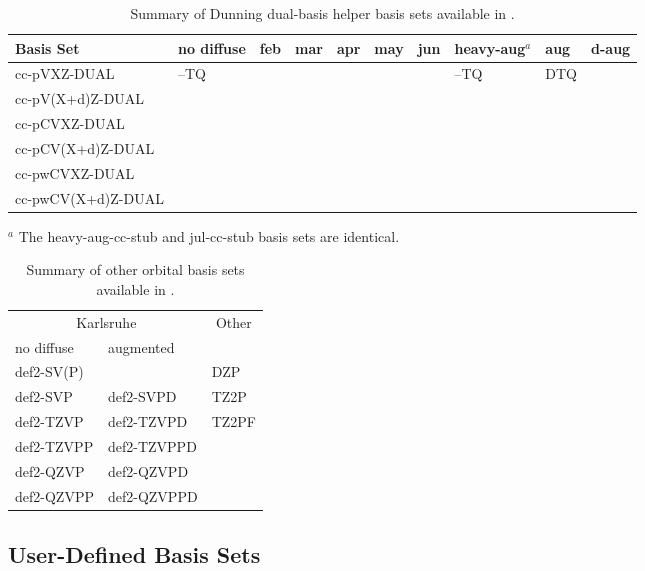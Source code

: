 \begin{table}[!htbp]
\begin{footnotesize}
\caption{Summary of Dunning dual-basis helper basis sets available in \PSIfour.} \label{table:basisDunningDUAL}
\parsep 10pt
\begin{center}
\begin{tabular}{llllllllll}
\hline\hline
Basis Set            & no diffuse & feb & mar & apr & may & jun & heavy-aug$^a$ & aug & d-aug \\
\hline
cc-pVXZ-DUAL         & --TQ &  &  &  &  &  & --TQ & DTQ &  \\
cc-pV(X+d)Z-DUAL     \\
cc-pCVXZ-DUAL        \\
cc-pCV(X+d)Z-DUAL    \\
cc-pwCVXZ-DUAL       \\
cc-pwCV(X+d)Z-DUAL   \\
\hline\hline
\end{tabular}
\end{center}
$^a$ The heavy-aug-cc-stub and jul-cc-stub basis sets are identical.
\end{footnotesize}
\end{table}


\begin{table}[!htbp]
\begin{footnotesize}
\caption{Summary of other orbital basis sets available in \PSIfour.} \label{table:basisOther}
\parsep 10pt
\begin{center}
\begin{tabular}{lll}
\hline\hline
\multicolumn{2}{c}{Karlsruhe} & \multicolumn{1}{c}{Other} \\
no diffuse & augmented & \\
\hline
def2-SV(P)   &             & DZP   \\
def2-SVP     & def2-SVPD   & TZ2P  \\
def2-TZVP    & def2-TZVPD  & TZ2PF \\
def2-TZVPP   & def2-TZVPPD &       \\
def2-QZVP    & def2-QZVPD  &       \\
def2-QZVPP   & def2-QZVPPD &       \\
\hline\hline
\end{tabular}
\end{center}
\end{footnotesize}
\end{table}


\subsection{User-Defined Basis Sets} \label{sec:BasisSetSpecification}

